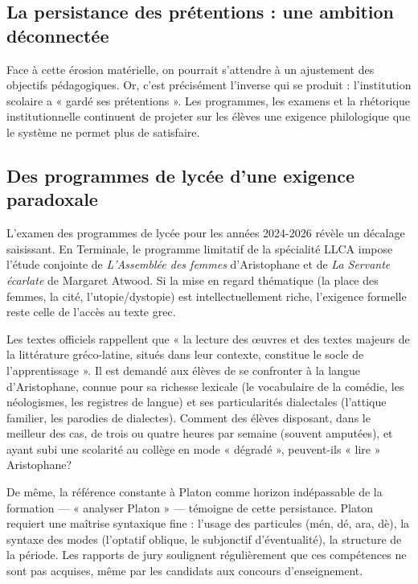 \subsection{La persistance des prétentions : une ambition déconnectée}

Face à cette érosion matérielle, on pourrait s'attendre à un ajustement des objectifs pédagogiques.
Or, c'est précisément l'inverse qui se produit : l'institution scolaire a « gardé ses prétentions ».
Les programmes, les examens et la rhétorique institutionnelle continuent de projeter sur les élèves
une exigence philologique que le système ne permet plus de satisfaire.



\subsection{Des programmes de lycée d'une exigence paradoxale}

L'examen des programmes de lycée pour les années 2024-2026 révèle un décalage saisissant. En
Terminale, le programme limitatif de la spécialité LLCA impose l'étude conjointe de
\textit{L'Assemblée des femmes} d'Aristophane et de \textit{La Servante écarlate} de Margaret
Atwood.\cite{I-3-3-ref8} Si la mise en regard thématique (la place des femmes, la cité,
l'utopie/dystopie) est intellectuellement riche, l'exigence formelle reste celle de l'accès au texte
grec.

Les textes officiels rappellent que « la lecture des œuvres et des textes majeurs de la littérature
gréco-latine, situés dans leur contexte, constitue le socle de l'apprentissage ».\cite{I-3-3-ref9}
Il est demandé aux élèves de se confronter à la langue d'Aristophane, connue pour sa richesse
lexicale (le vocabulaire de la comédie, les néologismes, les registres de langue) et ses
particularités dialectales (l'attique familier, les parodies de dialectes). Comment des élèves
disposant, dans le meilleur des cas, de trois ou quatre heures par semaine (souvent amputées), et
ayant subi une scolarité au collège en mode « dégradé », peuvent-ils « lire » Aristophane?

De même, la référence constante à Platon comme horizon indépassable de la formation — « analyser
Platon » — témoigne de cette persistance. Platon requiert une maîtrise syntaxique fine : l'usage des
particules (mén, dé, ara, dè), la syntaxe des modes (l'optatif oblique, le subjonctif
d'éventualité), la structure de la période. Les rapports de jury soulignent régulièrement que ces
compétences ne sont pas acquises, même par les candidats aux concours
d'enseignement.\cite{I-3-3-ref10}



